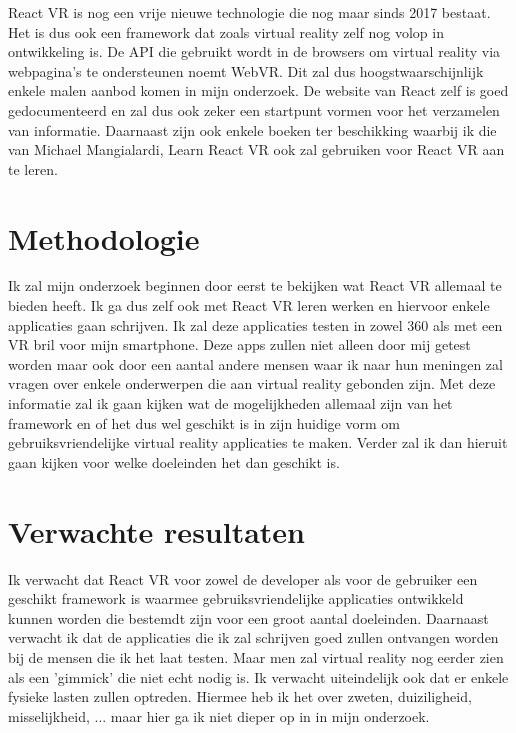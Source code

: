 \documentclass[fleqn,10pt]{voorstel}
\begin{document}
React VR is nog een vrije nieuwe technologie die nog maar sinds 2017 bestaat. Het is dus ook een framework dat zoals virtual reality zelf nog volop in ontwikkeling is. De API die gebruikt wordt in de browsers om virtual reality via webpagina's te ondersteunen noemt WebVR. Dit zal dus hoogstwaarschijnlijk enkele malen aanbod komen in mijn onderzoek. De website van React zelf is goed gedocumenteerd en zal dus ook zeker een startpunt vormen voor het verzamelen van informatie. Daarnaast zijn ook enkele boeken ter beschikking waarbij ik die van Michael Mangialardi, Learn React VR \autocite{Mangialardi2017} ook zal gebruiken voor React VR aan te leren.


\section{Methodologie}
\label{sec:methodologie}

Ik zal mijn onderzoek beginnen door eerst te bekijken wat React VR allemaal te bieden heeft. Ik ga dus zelf ook met React VR leren werken en hiervoor enkele applicaties gaan schrijven. Ik zal deze applicaties testen in zowel 360\textdegree \hspace{0em} als met een VR bril voor mijn smartphone. Deze apps zullen niet alleen door mij getest worden maar ook door een aantal andere mensen waar ik naar hun meningen zal vragen over enkele onderwerpen die aan virtual reality gebonden zijn. Met deze informatie zal ik gaan kijken wat de mogelijkheden allemaal zijn van het framework en of het dus wel geschikt is in zijn huidige vorm om gebruiksvriendelijke virtual reality applicaties te maken. Verder zal ik dan hieruit gaan kijken voor welke doeleinden het dan geschikt is. 
\section{Verwachte resultaten}
\label{sec:verwachte_resultaten}

Ik verwacht dat React VR voor zowel de developer als voor de gebruiker een geschikt framework is waarmee gebruiksvriendelijke applicaties ontwikkeld kunnen worden die bestemdt zijn voor een groot aantal doeleinden. Daarnaast verwacht ik dat de applicaties die ik zal schrijven goed zullen ontvangen worden bij de mensen die ik het laat testen. Maar men zal virtual reality nog eerder zien als een 'gimmick' die niet echt nodig is. Ik verwacht uiteindelijk ook dat er enkele fysieke lasten zullen optreden. Hiermee heb ik het over zweten, duiziligheid, misselijkheid, ... maar hier ga ik niet dieper op in in mijn onderzoek.
\end{document}
